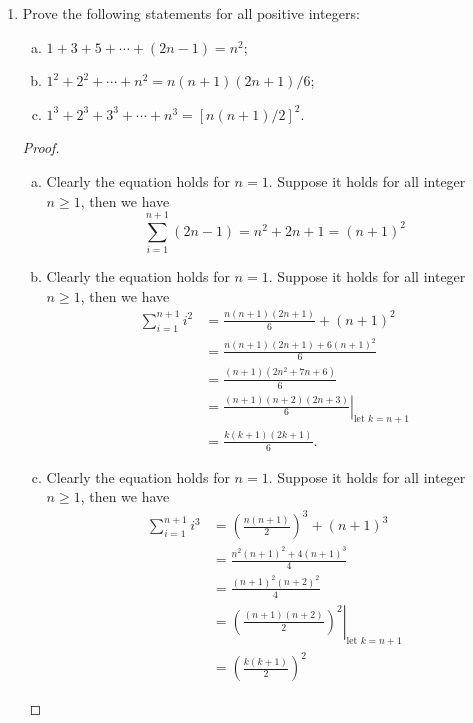 \begin{enumerate}[1.]
	\item Prove the following statements for all positive integers:
	\begin{enumerate}[(a)]
		\item $1 + 3 + 5 + \cdots + (2n - 1) = n^2$;
		\item $1^2 + 2^2 + \cdots + n^2 = n(n + 1)(2n + 1)/6$;
		\item $1^3 + 2^3 + 3^3 + \cdots + n^3 = [n (n + 1)/2]^2$.
	\end{enumerate}
	
	\begin{proof}
		\begin{enumerate}[(a)]
			\item Clearly the equation holds for $n = 1$. Suppose it holds for all integer $n \ge 1$, then we have
			$$
			\sum_{i = 1}^{n+1}(2n - 1) = n^2 + 2n + 1 = (n + 1)^2
			$$
			
			\item Clearly the equation holds for $n = 1$. Suppose it holds for all integer $n \ge 1$, then we have
			$$
			\begin{aligned}
				\sum_{i = 1}^{n + 1}i^2 &= \frac{n(n + 1)(2n + 1)}{6} + (n + 1)^2 \\
				&= \frac{n(n + 1)(2n + 1) + 6(n + 1)^2}{6} \\
				&= \frac{(n + 1)(2n^2 + 7n + 6)}{6} \\
				&= \left. \frac{(n + 1)(n + 2)(2n + 3)}{6} \right|_\text{let $k = n + 1$} \\
				&= \frac{k(k + 1)(2k + 1)}{6}.
			\end{aligned}
			$$
			
			\item Clearly the equation holds for $n = 1$. Suppose it holds for all integer $n \ge 1$, then we have
			$$
			\begin{aligned}
				\sum_{i = 1}^{n + 1} i^3 &= \left( \frac{n(n + 1)}{2} \right)^3 + (n + 1)^3 \\
				&= \frac{n^2 (n + 1)^2 + 4(n + 1)^3}{4} \\
				&= \frac{(n + 1)^2 (n + 2)^2}{4} \\
				&= \left. \left( \frac{(n + 1)(n + 2)}{2} \right)^2 \right|_\text{let $k = n + 1$}\\
				&= \left( \frac{k (k + 1)}{2} \right)^2
			\end{aligned}
			$$
		\end{enumerate}
	\end{proof}



\end{enumerate}
